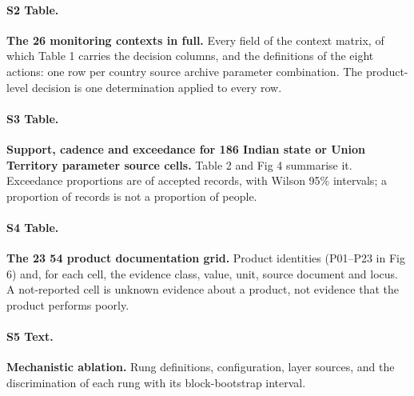 \documentclass[10pt,letterpaper]{article}
\begin{document}
\paragraph*{S2 Table.}
\label{S2_Table}
\textbf{The 26 monitoring contexts in full.} Every field of the context matrix, of which Table 1 carries the decision columns, and the definitions of the eight actions: one row per country \texttimes{} source archive \texttimes{} parameter combination. The product-level decision is one determination applied to every row.

\paragraph*{S3 Table.}
\label{S3_Table}
\textbf{Support, cadence and exceedance for 186 Indian state or Union Territory \texttimes{} parameter \texttimes{}
source cells.} Table 2 and Fig 4 summarise it. Exceedance proportions are of accepted records, with Wilson 95\% intervals; a proportion of records is not a proportion of people.

\paragraph*{S4 Table.}
\label{S4_Table}
\textbf{The 23 \texttimes{} 54 product documentation grid.} Product identities (P01--P23 in Fig 6) and, for each cell, the evidence class, value, unit, source document and locus. A not-reported cell is unknown evidence about a product, not evidence that the product performs poorly.

\paragraph*{S5 Text.}
\label{S5_Text}
\textbf{Mechanistic ablation.} Rung definitions, configuration, layer sources, and the discrimination of each rung with its block-bootstrap interval.
\end{document}
